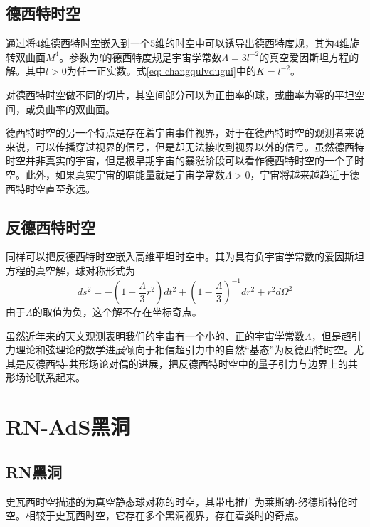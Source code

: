 \subsection{德西特时空}
通过将$4$维德西特时空嵌入到一个$5$维的时空中可以诱导出德西特度规，其为$4$维旋转双曲面$M^4$。参数为$l$的德西特度规是宇宙学常数$\Lambda=3l^{-2}$的真空爱因斯坦方程的解。其中$l>0$为任一正实数。式\eqref{eq: changqulvdugui}中的$K=l^{-2}$。

对德西特时空做不同的切片，其空间部分可以为正曲率的球，或曲率为零的平坦空间，或负曲率的双曲面。

德西特时空的另一个特点是存在着宇宙事件视界，对于在德西特时空的观测者来说来说，可以传播穿过视界的信号，但是却无法接收到视界以外的信号\citep{witten2001quantum}。虽然德西特时空并非真实的宇宙，但是极早期宇宙的暴涨阶段可以看作德西特时空的一个子时空。此外，如果真实宇宙的暗能量就是宇宙学常数$\Lambda>0$，宇宙将越来越趋近于德西特时空直至永远\citep{梁灿彬2006微分几何入门与广义相对论}。
\subsection{反德西特时空}
同样可以把反德西特时空嵌入高维平坦时空中。其为具有负宇宙学常数的爱因斯坦方程的真空解，球对称形式为
\begin{equation}
    ds^2=-\left(1-\frac{\Lambda}{3}r^2\right)dt^2+\left(1-\frac{\Lambda}{3}\right)^{-1}dr^2+r^2d\Omega^2
\end{equation}
由于$\Lambda$的取值为负，这个解不存在坐标奇点。

虽然近年来的天文观测表明我们的宇宙有一个小的、正的宇宙学常数$\Lambda$\citep{梁灿彬2006微分几何入门与广义相对论}，但是超引力理论和弦理论的数学进展倾向于相信超引力中的自然“基态”为反德西特时空。尤其是反德西特-共形场论对偶的进展，把反德西特时空中的量子引力与边界上的共形场论联系起来\citep{maldacena1999large,aharony2000large}。
\section{RN-AdS黑洞}
\subsection{RN黑洞}
史瓦西时空描述的为真空静态球对称的时空，其带电推广为莱斯纳-努德斯特伦时空。相较于史瓦西时空，它存在多个黑洞视界，存在着类时的奇点。

